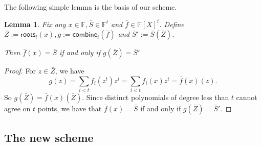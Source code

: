 \documentclass[11pt]{article} %
\newcommand{\F}{\ensuremath{\mathbb F}\xspace}
\newcommand{\defeq}{:=}
\newtheorem{lemma}{Lemma}[section]
\newcommand{\Z}{\mathbb{Z}}
\newcommand{\polys}{\ensuremath{\mathbb{F}[X]}\xspace}
\newcommand{\combine}[2]{\ensuremath{\mathsf{combine}_{#1}(#2)}\xspace}
\newcommand{\eval}[2]{\ensuremath{#1(#2)}\xspace}%
\newcommand{\roots}[2]{\ensuremath{\mathsf{roots}_{#1}(#2)}\xspace}
\newcommand{\f}{\ensuremath{\bar{f}}\xspace}
\renewcommand{\S}{\ensuremath{\bar{S}}\xspace}
\renewcommand{\Z}{\ensuremath{\bar{Z}}\xspace}
\newcommand{\sumi}[1]{\sum_{i<#1}}
\begin{document}
The following simple lemma is the basis of our scheme.

\begin{lemma}\label{lem:fftidentity}
Fix any $x\in \F, \S \in \F^t$ and $\f\in \polys^t$.
Define $\Z\defeq \roots{t}{x},g \defeq \combine{t}{\f}$ and $\S' \defeq \eval{\S}{\Z}$.

Then $\f(x)=\S$ if and only if $g(\Z)=\S'$
 
\end{lemma}
\begin{proof}
 For $z\in \Z$, we have
 \[g(z)=\sumi{t} f_i(z^t)z^i = \sumi{t}f_i(x)z^i = \eval{\f(x)}{z}.\]
 So $g(\Z) = \eval{\f(x)}{\Z}$.
 Since distinct polynomials of degree less than $t$ cannot agree on $t$ points, 
 we have that
 $\f(x)=\S$ if and only if $g(\Z)=\S'$.
\end{proof}
\subsection{The new scheme}\label{subsec:newPCS}
\end{document}
